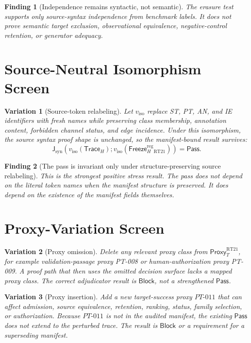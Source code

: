 \documentclass[11pt]{article}
\newcommand{\ProxyT}{\mathsf{Proxy}_{T}}
\newcommand{\TraceH}{\mathsf{Trace}_{H}}
\newcommand{\FreezeH}{\mathsf{Freeze}_{H}}
\newcommand{\JudgeSyn}{\mathsf{J}_{\mathrm{syn}}}
\newcommand{\Pass}{\mathsf{Pass}}
\newcommand{\Block}{\mathsf{Block}}
\newtheorem{finding}{Finding}
\newtheorem{variant}{Variation}
\begin{document}
\begin{finding}[Independence remains syntactic, not semantic]
The erasure test supports only source-syntax independence from benchmark
labels. It does not prove semantic target exclusion, observational
equivalence, negative-control retention, or generator adequacy.
\end{finding}

\section{Source-Neutral Isomorphism Screen}

\begin{variant}[Source-token relabeling]
Let \(v_{\mathrm{iso}}\) replace ST, PT, AN, and IE identifiers with fresh
names while preserving class membership, annotation content, forbidden
channel status, and edge incidence. Under this isomorphism, the source
syntax proof shape is unchanged, so the manifest-bound result survives:
\[
    \JudgeSyn(v_{\mathrm{iso}}(\TraceH);
    v_{\mathrm{iso}}(\FreezeH^{\mathrm{reg}}_{\mathrm{RT21}}))=\Pass.
\]
\end{variant}

\begin{finding}[The pass is invariant only under structure-preserving
source relabeling]
This is the strongest positive stress result. The pass does not depend on
the literal token names when the manifest structure is preserved. It does
depend on the existence of the manifest fields themselves.
\end{finding}

\section{Proxy-Variation Screen}

\begin{variant}[Proxy omission]
Delete any relevant proxy class from \(\ProxyT^{\mathrm{RT21}}\), for
example validation-passage proxy PT-008 or human-authorization proxy
PT-009. A proof path that then uses the omitted decision surface lacks a
mapped proxy class. The correct adjudicator result is \(\Block\), not a
strengthened \(\Pass\).
\end{variant}

\begin{variant}[Proxy insertion]
Add a new target-success proxy \(PT\text{-}011\) that can affect admission,
source equivalence, retention, ranking, status, family selection, or
authorization. Because \(PT\text{-}011\) is not in the audited manifest,
the existing \(\Pass\) does not extend to the perturbed trace. The result
is \(\Block\) or a requirement for a superseding manifest.
\end{variant}
\end{document}

